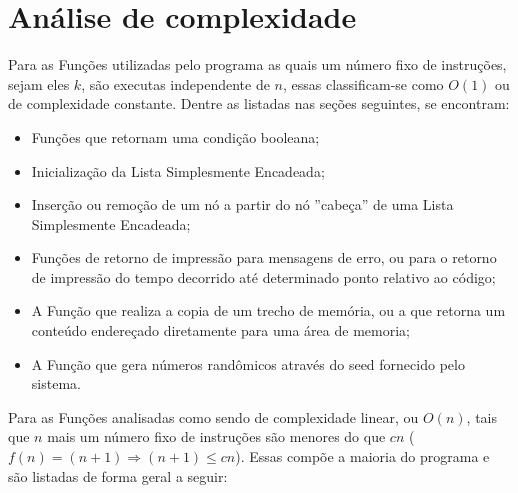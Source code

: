 \documentclass[12pt,a4paper]{article}
\begin{document}
\section{Análise de complexidade}

Para as Funções utilizadas pelo programa as quais um número fixo de instruções, sejam eles $k$, são executas independente de $n$, essas classificam-se como $O(1)$ ou de complexidade constante. Dentre as listadas nas seções seguintes, se encontram:

\begin{itemize}
	\setlength\itemsep{1pt}
	\item Funções que retornam uma condição booleana; 
	\item Inicialização da Lista Simplesmente Encadeada;
	\item Inserção ou remoção de um nó a partir do nó ''cabeça'' de uma Lista Simplesmente Encadeada;
	\item Funções de retorno de impressão para mensagens de erro, ou para o retorno de impressão do tempo decorrido até determinado ponto relativo ao código;
	\item A Função que realiza a copia de um trecho de memória, ou a que retorna um conteúdo endereçado diretamente para uma área de memoria;
	\item A Função que gera números randômicos através do seed fornecido pelo sistema.
\end{itemize}

Para as Funções analisadas como sendo de complexidade linear, ou $O(n)$, tais que $n$ mais um número fixo de instruções são menores do que $cn$ ($f(n) = (n+1) \Rightarrow (n+1) \leqslant cn$). Essas compõe a maioria do programa e são listadas de forma geral a seguir:
\end{document}
